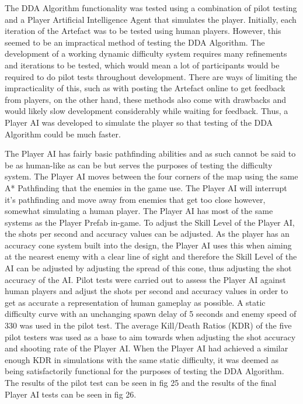 \documentclass[journal]{IEEEtran}
\begin{document}
The DDA Algorithm functionality was tested using a combination of pilot testing and a Player Artificial Intelligence Agent that simulates the player. Initially, each iteration of the Artefact was to be tested using human players. However, this seemed to be an impractical method of testing the DDA Algorithm. The development of a working dynamic difficulty system requires many refinements and iterations to be tested, which would mean a lot of participants would be required to do pilot tests throughout development. There are ways of limiting the impracticality of this, such as with posting the Artefact online to get feedback from players, on the other hand, these methods also come with drawbacks and would likely slow development considerably while waiting for feedback. Thus, a Player AI was developed to simulate the player so that testing of the DDA Algorithm could be much faster. 

The Player AI has fairly basic pathfinding abilities and as such cannot be said to be as human-like as can be but serves the purposes of testing the difficulty system. The Player AI moves between the four corners of the map using the same A* Pathfinding that the enemies in the game use. The Player AI will interrupt it's pathfinding and move away from enemies that get too close however, somewhat simulating a human player. The Player AI has most of the same systems as the Player Prefab in-game. To adjust the Skill Level of the Player AI, the shots per second and accuracy values can be adjusted. As the player has an accuracy cone system built into the design, the Player AI uses this when aiming at the nearest enemy with a clear line of sight and therefore the Skill Level of the AI can be adjusted by adjusting the spread of this cone, thus adjusting the shot accuracy of the AI. Pilot tests were carried out to assess the Player AI against human players and adjust the shots per second and accuracy values in order to get as accurate a representation of human gameplay as possible. A static difficulty curve with an unchanging spawn delay of 5 seconds and enemy speed of 330 was used in the pilot test. The average Kill/Death Ratios (KDR) of the five pilot testers was used as a base to aim towards when adjusting the shot accuracy and shooting rate of the Player AI. When the Player AI had achieved a similar enough KDR in simulations with the same static difficulty, it was deemed as being satisfactorily functional for the purposes of testing the DDA Algorithm. The results of the pilot test can be seen in fig 25 and the results of the final Player AI tests can be seen in fig 26.
\end{document}
